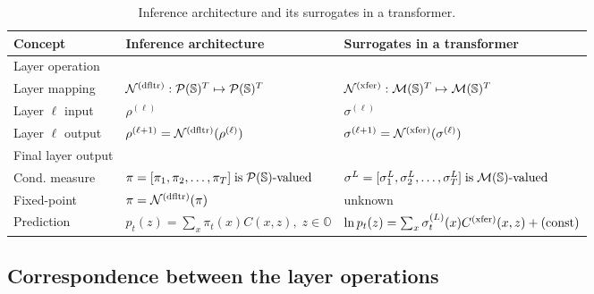 \documentclass[twoside,11pt]{article}
\def\Fig#1{Fig.~\ref{#1}}
\def\clP{{\cal P}}
\def\Fig#1{Fig.~\ref{#1}}
\def\bS{\begin{slide}}
\def\clP{{\cal P}}
\def\clM{{\cal M}}
\def\clN{{\cal N}}
\def\clP{{\cal P}}
\def\bS{\mathbb{S}}
\def\bO{\mathbb{O}}
\def\xfer{{\text{\rm (xfer)}}}
\def\dfltr{{\text{\rm (dfltr)}}}
\begin{document}
\begin{table}[h]
  \centering
  \begin{tabularx}{\textwidth}{l l l}
    \toprule
    \textbf{Concept} & \textbf{Inference architecture} & \textbf{Surrogates in a transformer} \\
    \midrule
    Layer operation & \\
    Layer mapping & $\clN^\dfltr:\clP(\bS)^T \mapsto \clP(\bS)^T $ & ${\cal N}^\xfer:{\cal M}(\bS)^T \mapsto {\cal M}(\bS)^T$ \\
    Layer $\ell$ input & \( \rho^{(\ell)} \) & \( \sigma^{(\ell)}\) \\
    Layer $\ell$ output & \( \rho^{(\ell+1)} =
                          \clN^\dfltr(\rho^{(\ell)}) \) & \(
                                                          \sigma^{(\ell+1)}
                                                          = {\cal
                                                          N}^\xfer(\sigma^{(\ell)})
                                                          \) \\
     \midrule
    Final layer output & \\
    Cond. measure & $\pi=[\pi_1,\pi_2,\hdots,\pi_T]
                          \;\text{is}\; \clP(\bS)\text{-valued}$ & $\sigma^L=[\sigma^L_1,\sigma^L_2,\hdots,\sigma^L_T]
                          \;\text{is}\; \clM(\bS)\text{-valued}$ \\
    Fixed-point & \( \pi = \clN^\dfltr(\pi) \) & unknown \\
    Prediction & \( p_t(z)= \sum_{x}\pi_t(x)C(x,z),\;z\in\bO\) & \( \ln p_t(z) = \sum_{x}\sigma_t^{(L)} (x)C^\xfer(x,z)+\text{(const)}\) \\
    \bottomrule
  \end{tabularx}
  \vspace*{-10pt}
  \caption{Inference architecture and its surrogates in a transformer.}
  \label{tab:correspondence_solution}
\end{table}

\subsection{Correspondence between the layer operations}
\label{sec:correspondence_layer_ops}
\end{document}

